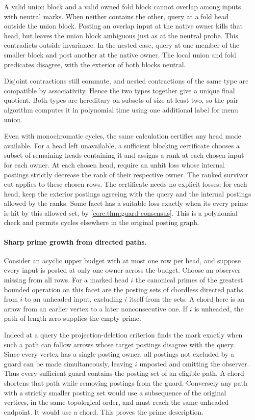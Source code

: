 A valid union block and a valid owned fold block
cannot overlap among inputs with neutral marks.
When neither contains the other, query at a fold
head outside the union block. Posting an overlap
input at the native owner kills that head, but
leaves the union block ambiguous just as at the
neutral probe. This contradicts outside invariance.
In the nested case, query at one member of the
smaller block and post another at the native owner.
The local union and fold predicates disagree, with
the exterior of both blocks neutral.

Disjoint contractions still commute, and nested
contractions of the same type are compatible by
associativity. Hence the two types together give a
unique final quotient. Both types are hereditary on
subsets of size at least two, so the pair algorithm
computes it in polynomial time using one additional
label for menu union.

Even with monochromatic cycles, the same calculation
certifies any head made available. For a head left
unavailable, a sufficient blocking certificate
chooses a subset of remaining heads containing it
and assigns a rank at each chosen input for each
owner. At each chosen head, require an unhit
loss whose internal postings strictly decrease
the rank of their respective owner. The ranked
survivor cut applies to these chosen rows. The
certificate needs no explicit losses: for each
head, keep the exterior postings agreeing with
the query and the internal postings allowed by
the ranks. Some facet has a suitable loss exactly
when its every prime is hit by this allowed set,
by \cref{core:thm:guard-consensus}. This is a
polynomial check and permits cycles elsewhere in
the original posting graph.

\paragraph{Sharp prime growth from directed paths.}
Consider an acyclic upper budget with at most one
row per head, and suppose every input is posted at
only one owner across the budget. Choose an observer
missing from all rows. For a marked head $i$ the
canonical primes of the greatest bounded operation
on this facet are the posting sets of chordless
directed paths from $i$ to an unheaded input, excluding
$i$ itself from the sets. A chord here is an arrow
from an earlier vertex to a later nonconsecutive one.
If $i$ is unheaded, the path of length zero supplies
the empty prime.

Indeed at a query the projection-deletion criterion
finds the mark exactly when such a path can follow
arrows whose target postings disagree with the query.
Since every vertex has a single posting owner, all
postings not excluded by a guard can be made
simultaneously, leaving $i$ unposted and omitting the
observer. Thus every sufficient guard contains the
posting set of an eligible path. A chord shortens
that path while removing postings from the guard.
Conversely any path with a strictly smaller posting
set would use a subsequence of the original vertices,
in the same topological order, and must reach the
same unheaded endpoint. It would use a chord.
This proves the prime description.

